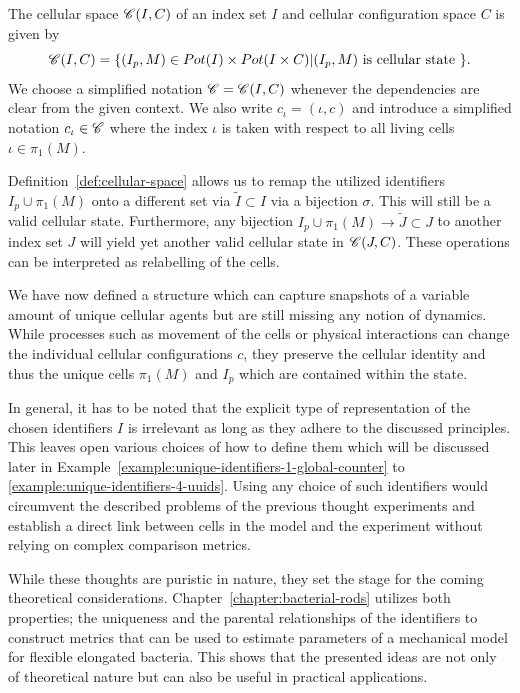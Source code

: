 \begin{definition}
    The cellular space $\mathscr{C}(I, C)$ of an index set $I$ and cellular configuration space $C$
    is given by
    \begin{equation}
        \mathscr{C}(I,C) = \{(I_p,M)\in Pot(I)\times Pot(I\times C) | (I_p,M) \text{ is cellular state }\}.
    \end{equation}
    We choose a simplified notation $\mathscr{C} = \mathscr{C}(I, C)$ whenever the dependencies are clear from the
    given context.
    We also write $c_\iota=(\iota,c)$ and introduce a simplified notation $c_\iota\in\mathscr{C}$ where the
    index $\iota$ is taken with respect to all living cells $\iota\in \pi_1(M)$.
    \label{def:cellular-space}
\end{definition}

Definition~\ref{def:cellular-space} allows us to remap the utilized identifiers $I_p\cup\pi_1(M)$
onto a different set via $\tilde{I}\subset I$ via a bijection $\sigma$.
This will still be a valid cellular state.
Furthermore, any bijection $I_p\cup\pi_1(M)\rightarrow\tilde{J}\subset J$ to another index set $J$
will yield yet another valid cellular state in $\mathscr{C}(J,C)$.
These operations can be interpreted as relabelling of the cells.

We have now defined a structure which can capture snapshots of a variable amount of unique cellular
agents but are still missing any notion of dynamics.
While processes such as movement of the cells or physical interactions can change the individual
cellular configurations $c$, they preserve the cellular identity and thus the unique cells
$\pi_1(M)$ and $I_p$ which are contained within the state.

In general, it has to be noted that the explicit type of representation of the chosen identifiers
$I$ is irrelevant as long as they adhere to the discussed principles.
This leaves open various choices of how to define them which will be discussed later in
Example~\ref{example:unique-identifiers-1-global-counter} to
\ref{example:unique-identifiers-4-uuids}.
Using any choice of such identifiers would circumvent the described problems of the previous
thought experiments and establish a direct link between cells in the model and
the experiment without relying on complex comparison metrics.

While these thoughts are puristic in nature, they set the stage for the coming theoretical
considerations.
Chapter~\ref{chapter:bacterial-rods} utilizes both properties; the uniqueness and
the parental relationships of the identifiers to construct metrics that can be used to estimate
parameters of a mechanical model for flexible elongated bacteria.
This shows that the presented ideas are not only of theoretical nature but can also be useful in
practical applications.

